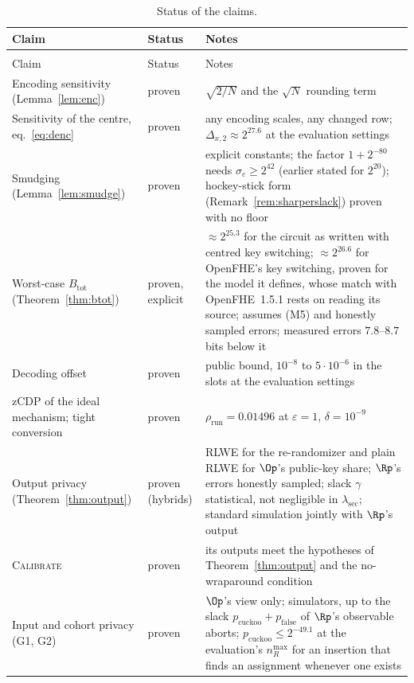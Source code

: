 {\small
\setlength{\LTcapwidth}{\textwidth}
\begin{xltabular}{\textwidth}{@{}>{\raggedright\arraybackslash}p{4.4cm}>{\raggedright\arraybackslash}p{2.6cm}>{\raggedright\arraybackslash}X@{}}
\caption{Status of the claims.}
\label{tab:status}\\
\toprule
Claim & Status & Notes \\
\midrule
\endfirsthead
{} \\
\toprule
Claim & Status & Notes \\
\midrule
\endhead
Encoding sensitivity (Lemma~\ref{lem:enc}) & proven & $\sqrt{2/N}$ and the $\sqrt N$ rounding term \\
Sensitivity of the centre, eq.~\eqref{eq:denc} & proven & any encoding scales, any changed row; $\Delta_{x,2} \approx 2^{27.6}$ at the evaluation settings \\
Smudging (Lemma~\ref{lem:smudge}) & proven & explicit constants; the factor $1 + 2^{-80}$ needs $\sigma_c \ge 2^{42}$ (earlier stated for $2^{20}$); hockey-stick form (Remark~\ref{rem:sharperslack}) proven with no floor \\
Worst-case $B_{\mathrm{tot}}$ (Theorem~\ref{thm:btot}) & proven, explicit & $\approx 2^{25.3}$ for the circuit as written with centred key switching; $\approx 2^{26.6}$ for OpenFHE's key switching, proven for the model it defines, whose match with OpenFHE~1.5.1 rests on reading its source; assumes (M5) and honestly sampled errors; measured errors $7.8$--$8.7$ bits below it \\
Decoding offset & proven & public bound, $10^{-8}$ to $5 \cdot 10^{-6}$ in the slots at the evaluation settings \\
zCDP of the ideal mechanism; tight conversion & proven & $\rho_{\mathrm{run}} = 0.01496$ at $\varepsilon = 1$, $\delta = 10^{-9}$ \\
Output privacy (Theorem~\ref{thm:output}) & proven (hybrids) & RLWE for the re-randomizer and plain RLWE for $\Op$'s public-key share; $\Rp$'s errors honestly sampled; slack $\gamma$ statistical, not negligible in $\lambda_{\mathrm{sec}}$; standard simulation jointly with $\Rp$'s output \\
\textsc{Calibrate} & proven & its outputs meet the hypotheses of Theorem~\ref{thm:output} and the no-wraparound condition \\
Input and cohort privacy (G1, G2) & proven & $\Op$'s view only; simulators, up to the slack $p_{\mathrm{cuckoo}} + p_{\mathrm{false}}$ of $\Rp$'s observable aborts; $p_{\mathrm{cuckoo}} \le 2^{-49.1}$ at the evaluation's $n_R^{\max}$ for an insertion that finds an assignment whenever one exists \\

\end{xltabular}}

